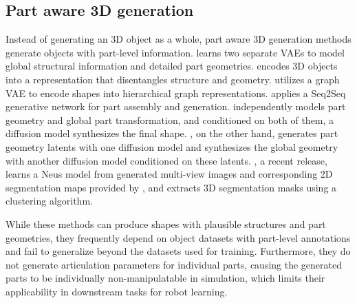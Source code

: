 \subsection{Part aware 3D generation} Instead of generating an 3D object as a whole, part aware 3D generation methods generate objects with part-level information. \cite{gao2019sdm} learns two separate VAEs to model global structural information and detailed part geometries. \cite{yang2022dsg} encodes 3D objects into a representation that disentangles structure and geometry. \cite{mo2019structurenet} utilizes a graph VAE to encode shapes into hierarchical graph representations. \cite{wu2020pq} applies a Seq2Seq generative network for part assembly and generation. \cite{nakayama2023difffacto} independently models part geometry and global part transformation, and conditioned on both of them, a diffusion model synthesizes the final shape. \cite{koo2023salad}, on the other hand, generates part geometry latents with one diffusion model and synthesizes the global geometry with another diffusion model conditioned on these latents. \cite{liu2024part123}, a recent release, learns a Neus model from generated multi-view images and corresponding 2D segmentation maps provided by \cite{kirillov2023segment}, and extracts 3D segmentation masks using a clustering algorithm.

While these methods can produce shapes with plausible structures and part geometries, they frequently depend on object datasets with part-level annotations and fail to generalize beyond the datasets used for training. Furthermore, they do not generate articulation parameters for individual parts, causing the generated parts to be individually non-manipulatable in simulation, which limits their applicability in downstream tasks for robot learning.